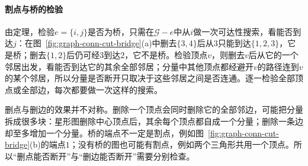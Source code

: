 \paragraph{割点与桥的检验}
由定理，检验$e=\{i,j\}$是否为桥，只需在$\mathcal G-e$中从$i$做一次可达性搜索，看能否到达$j$：在图~\ref{fig:graph-conn-cut-bridge}(a)中删去$\{3,4\}$后从$3$只能到达$\{1,2,3\}$，它是桥；删去$\{1,2\}$后仍可经$3$到达$2$，它不是桥。检验顶点$v$，则删去$v$后从它的一个邻居出发，看能否到达它的其余全部邻居；分量中其他顶点都经避开$v$的路径连到$v$的某个邻居，所以分量是否断开只取决于这些邻居之间是否连通。逐一检验全部顶点或全部边，每次都要做一次这样的搜索。

删点与删边的效果并不对称。删除一个顶点会同时删除它的全部邻边，可能把分量拆成很多块：星形图删除中心顶点后，其余每个顶点都自成一个分量；删除一条边却至多增加一个分量。桥的端点不一定是割点，例如图~\ref{fig:graph-conn-cut-bridge}(b)的端点$1$；没有桥的图也可能有割点，例如两个三角形共用一个顶点。所以“删点能否断开”与“删边能否断开”需要分别检查。
